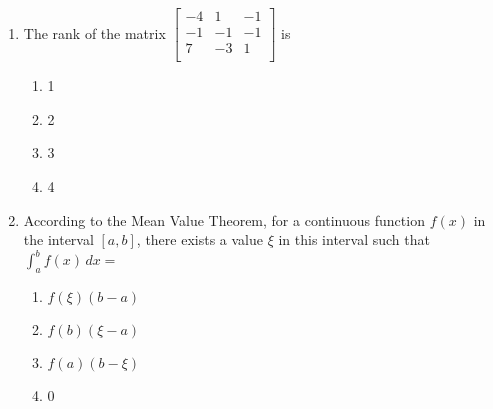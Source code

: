 \documentclass[journal,9pt,onecolumn]{IEEEtran}
\begin{document}
\begin{enumerate}
\begin{multicols}{4}
\begin{enumerate}
    \item $\frac{1}{72}$
    \item $\frac{1}{55}$
    \item $\frac{1}{36}$
    \item $\frac{1}{27}$
\end{enumerate}
\end{multicols}


\item The rank of the matrix  $\begin{bmatrix}
-4 & 1 & -1 \\
-1 & -1 & -1 \\
7 & -3 & 1 \\
\end{bmatrix}$ is \hfill {}

\begin{multicols}{4}
\begin{enumerate}
    \item 1
    \item 2
    \item 3
    \item 4
\end{enumerate}
\end{multicols}


\item According to the Mean Value Theorem, for a continuous function $f(x)$ in the interval $[a, b]$, there exists a value $\xi$ in this interval such that  $\int_a^b f(x) \, dx = $
\hfill {}
\begin{multicols}{4}
\begin{enumerate}
    \item $f(\xi)(b-a)$
    \item $f(b)(\xi - a)$
    \item $f(a)(b - \xi)$
    \item 0
\end{enumerate}
\end{multicols}

\end{enumerate}
\end{document}
